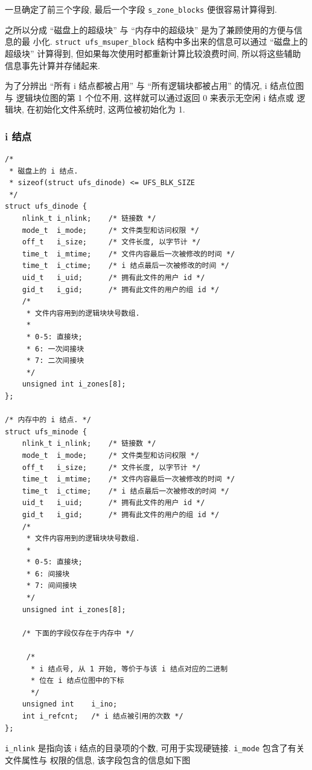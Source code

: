 \documentclass[nofonts, titlepage]{ctexart}
\begin{document}
一旦确定了前三个字段, 最后一个字段 \texttt{s\_zone\_blocks}
便很容易计算得到.

之所以分成 ``磁盘上的超级块'' 与 ``内存中的超级块''
是为了兼顾使用的方便与信息的最 小化. \texttt{struct ufs\_msuper\_block}
结构中多出来的信息可以通过 ``磁盘上的超级块'' 计算得到,
但如果每次使用时都重新计算比较浪费时间,
所以将这些辅助信息事先计算并存储起来.

为了分辨出 ``所有 i 结点都被占用'' 与 ``所有逻辑块都被占用'' 的情况, i
结点位图与 逻辑块位图的第 1 个位不用, 这样就可以通过返回 0 来表示无空闲
i 结点或 逻辑块, 在初始化文件系统时, 这两位被初始化为 1.

\subsubsection{i 结点}\label{i-ux7ed3ux70b9}

\begin{verbatim}
/*
 * 磁盘上的 i 结点.
 * sizeof(struct ufs_dinode) <= UFS_BLK_SIZE
 */
struct ufs_dinode {
    nlink_t i_nlink;    /* 链接数 */
    mode_t  i_mode;     /* 文件类型和访问权限 */
    off_t   i_size;     /* 文件长度, 以字节计 */
    time_t  i_mtime;    /* 文件内容最后一次被修改的时间 */
    time_t  i_ctime;    /* i 结点最后一次被修改的时间 */
    uid_t   i_uid;      /* 拥有此文件的用户 id */
    gid_t   i_gid;      /* 拥有此文件的用户的组 id */
    /*
     * 文件内容用到的逻辑块块号数组.
     *
     * 0-5: 直接块;
     * 6: 一次间接块
     * 7: 二次间接块
     */
    unsigned int i_zones[8];
};

/* 内存中的 i 结点. */
struct ufs_minode {
    nlink_t i_nlink;    /* 链接数 */
    mode_t  i_mode;     /* 文件类型和访问权限 */
    off_t   i_size;     /* 文件长度, 以字节计 */
    time_t  i_mtime;    /* 文件内容最后一次被修改的时间 */
    time_t  i_ctime;    /* i 结点最后一次被修改的时间 */
    uid_t   i_uid;      /* 拥有此文件的用户 id */
    gid_t   i_gid;      /* 拥有此文件的用户的组 id */
    /*
     * 文件内容用到的逻辑块块号数组.
     *
     * 0-5: 直接块;
     * 6: 间接块
     * 7: 间间接块
     */
    unsigned int i_zones[8];

    /* 下面的字段仅存在于内存中 */

     /*
      * i 结点号, 从 1 开始, 等价于与该 i 结点对应的二进制
      * 位在 i 结点位图中的下标
      */
    unsigned int    i_ino;    
    int i_refcnt;   /* i 结点被引用的次数 */
};
\end{verbatim}

\texttt{i\_nlink} 是指向该 i 结点的目录项的个数, 可用于实现硬链接.
\texttt{i\_mode} 包含了有关文件属性与 权限的信息, 该字段包含的信息如下图
\end{document}
